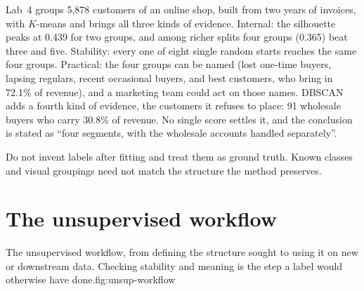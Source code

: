 \begin{workedexample}
Lab~4 groups 5,878 customers of an online shop, built from two years of invoices, with $K$-means and brings all three kinds of evidence. Internal: the silhouette peaks at 0.439 for two groups, and among richer splits four groups (0.365) beat three and five. Stability: every one of eight single random starts reaches the same four groups. Practical: the four groups can be named (lost one-time buyers, lapsing regulars, recent occasional buyers, and best customers, who bring in 72.1\% of revenue), and a marketing team could act on those names. DBSCAN adds a fourth kind of evidence, the customers it refuses to place: 91 wholesale buyers who carry 30.8\% of revenue. No single score settles it, and the conclusion is stated as ``four segments, with the wholesale accounts handled separately''.
\end{workedexample}

\begin{pitfall}
Do not invent labels after fitting and treat them as ground truth. Known classes and visual groupings need not match the structure the method preserves.
\end{pitfall}

\section{The unsupervised workflow}

\begin{utpfig}{The unsupervised workflow, from defining the structure sought to using it on new or downstream data. Checking stability and meaning is the step a label would otherwise have done.}{fig:unsup-workflow}
\end{utpfig}


